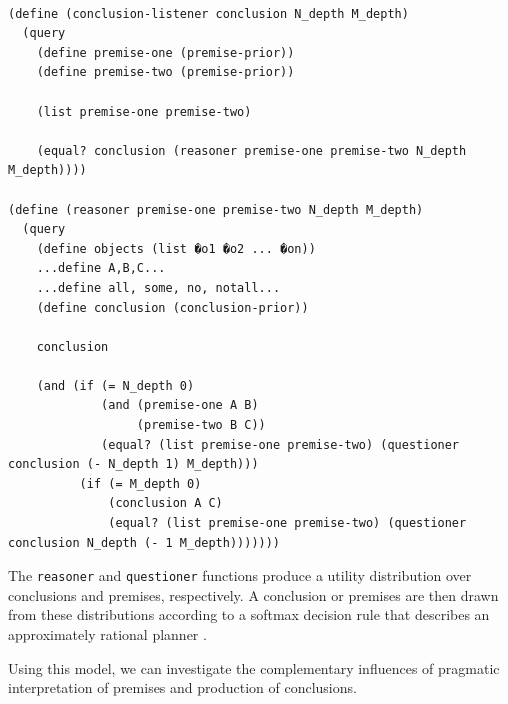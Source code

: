 \documentclass[10pt,letterpaper]{article}
\begin{document}
\begin{lstlisting}

(define (conclusion-listener conclusion N_depth M_depth)
  (query 
    (define premise-one (premise-prior))
    (define premise-two (premise-prior))
    
    (list premise-one premise-two)
    
    (equal? conclusion (reasoner premise-one premise-two N_depth M_depth))))

(define (reasoner premise-one premise-two N_depth M_depth)
  (query 
    (define objects (list �o1 �o2 ... �on)) 
    ...define A,B,C...
    ...define all, some, no, notall...
    (define conclusion (conclusion-prior))
 
    conclusion
    
    (and (if (= N_depth 0)
    		 (and (premise-one A B)
                  (premise-two B C))
      		 (equal? (list premise-one premise-two) (questioner conclusion (- N_depth 1) M_depth)))
          (if (= M_depth 0)
              (conclusion A C)
              (equal? (list premise-one premise-two) (questioner conclusion N_depth (- 1 M_depth)))))))

\end{lstlisting}
The \lstinline{reasoner} and \lstinline{questioner} functions produce a utility distribution over conclusions and premises, respectively. A conclusion or premises are then drawn from these distributions according to a softmax decision rule that describes an approximately rational planner \cite{suttonbarto98}.

Using this model, we can investigate the complementary influences of pragmatic interpretation of premises and production of conclusions. 
\end{document}
